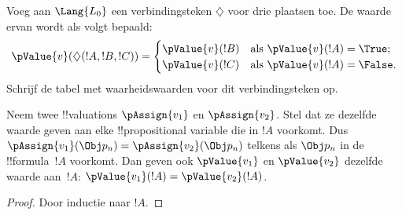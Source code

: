\documentclass[openany]{memoir}
\begin{document}
\begin{prob}
Voeg aan $\Lang{L_0}$ een verbindingsteken $\diamondsuit$ voor drie
plaatsen toe. De waarde ervan wordt als volgt bepaald:
\begin{gather*}
  \pValue{v}(\diamondsuit( !A , !B , !C ) ) = \begin{cases}
    \pValue{v}( !B ) &
    \text{als $\pValue{v}(!A) = \True$;}\\
    \pValue{v}( !C ) &
    \text{als $\pValue{v}(!A) = \False $}.
  \end{cases}
\end{gather*}
Schrijf de tabel met waarheidswaarden voor dit verbindingsteken op.
\end{prob}

\begin{thm}
 Neem twee !!{valuation}s
$\pAssign{v_1}$ en $\pAssign{v_2}$. Stel dat ze dezelfde waarde geven
aan elke !!{propositional variable} die in $!A$ voorkomt. Dus
$\pAssign{v_1}(\Obj p_n) = \pAssign{v_2}(\Obj p_n)$ telkens als
$\Obj p_n$ in de !!{formula}~$!A$ voorkomt. Dan geven ook
$\pValue{v_1}$ en $\pValue{v_2}$ dezelfde waarde aan~$!A$:
$\pValue{v_1}(!A) = \pValue{v_2}(!A)$.
\end{thm}

\begin{proof}
Door inductie naar $!A$.
\end{proof}
\end{document}
